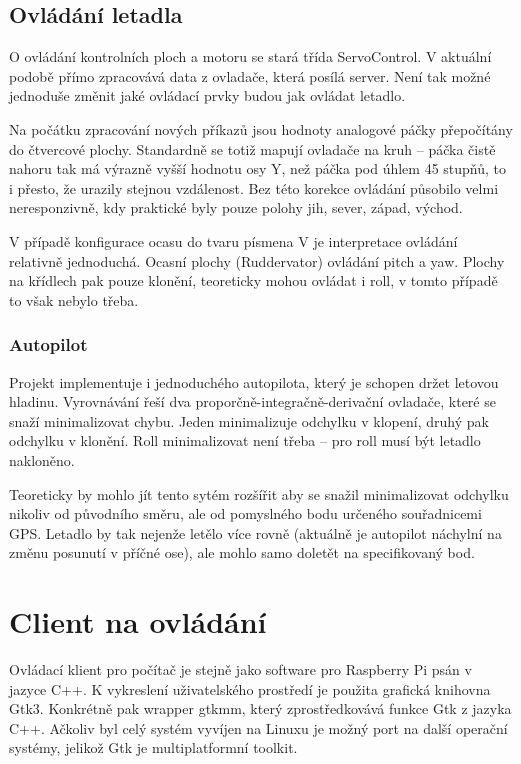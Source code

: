 \documentclass[a4paper,oneside,12pt]{report}
\begin{document}
\section{Ovládání letadla}

O ovládání kontrolních ploch a motoru se stará třída ServoControl.
V aktuální podobě přímo zpracovává data z ovladače, která posílá server.
Není tak možné jednoduše změnit jaké ovládací prvky budou jak ovládat letadlo.

Na počátku zpracování nových příkazů jsou hodnoty analogové páčky přepočítány do čtvercové plochy.
Standardně se totiž mapují ovladače na kruh -- páčka čistě nahoru tak má výrazně vyšší hodnotu osy Y, než páčka pod úhlem 45 stupňů, to i přesto, že urazily stejnou vzdálenost.
Bez této korekce ovládání působilo velmi neresponzivně, kdy praktické byly pouze polohy jih, sever, západ, východ.

V případě konfigurace ocasu do tvaru písmena V je interpretace ovládání relativně jednoduchá.
Ocasní plochy (Ruddervator) ovládání pitch a yaw.
Plochy na křídlech pak pouze klonění, teoreticky mohou ovládat i roll, v tomto případě to však nebylo třeba.

\subsection{Autopilot}

Projekt implementuje i jednoduchého autopilota, který je schopen držet letovou hladinu.
Vyrovnávání řeší dva proporčně-integračně-derivační ovladače, které se snaží minimalizovat chybu.
Jeden minimalizuje odchylku v klopení, druhý pak odchylku v klonění.
Roll minimalizovat není třeba -- pro roll musí být letadlo nakloněno.

Teoreticky by mohlo jít tento sytém rozšířit aby se snažil minimalizovat odchylku nikoliv od původního směru, ale od pomyslného bodu určeného souřadnicemi GPS.
Letadlo by tak nejenže letělo více rovně (aktuálně je autopilot náchylní na změnu posunutí v příčné ose), ale mohlo samo doletět na specifikovaný bod.


\chapter{Client na ovládání}

Ovládací klient pro počítač je stejně jako software pro Raspberry Pi psán v jazyce C++.
K vykreslení uživatelského prostředí je použita grafická knihovna Gtk3.
Konkrétně pak wrapper gtkmm, který zprostředkovává funkce Gtk z jazyka C++.
Ačkoliv byl celý systém vyvíjen na Linuxu je možný port na další operační systémy, jelikož Gtk je multiplatformní toolkit.
\end{document}
